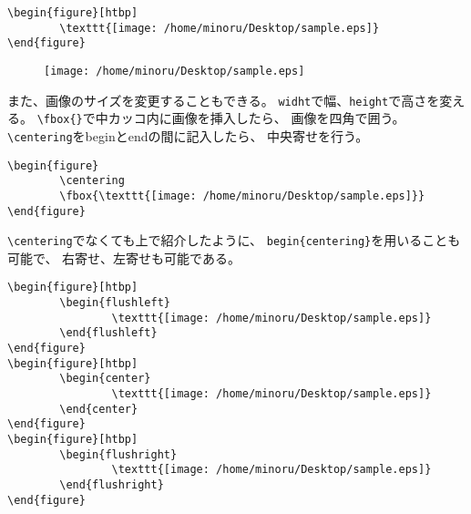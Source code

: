 \documentclass{jsarticle}
\begin{document}
\begin{verbatim}
\begin{figure}[htbp]
		\texttt{[image: /home/minoru/Desktop/sample.eps]}
\end{figure}
\end{verbatim}

\begin{figure}[htbp]
		\texttt{[image: /home/minoru/Desktop/sample.eps]}
\end{figure}

また、画像のサイズを変更することもできる。
\verb|widht|で幅、\verb|height|で高さを変える。
\verb|\fbox{}|で中カッコ内に画像を挿入したら、
画像を四角で囲う。
\verb|\centering|をbeginとendの間に記入したら、
中央寄せを行う。\par

\begin{verbatim}
\begin{figure}
		\centering
		\fbox{\texttt{[image: /home/minoru/Desktop/sample.eps]}}
\end{figure}
\end{verbatim}

\begin{figure}
		\centering
\end{figure}

\verb|\centering|でなくても上で紹介したように、
\verb|begin{centering}|を用いることも可能で、
右寄せ、左寄せも可能である。

\begin{verbatim}
\begin{figure}[htbp]
		\begin{flushleft}
				\texttt{[image: /home/minoru/Desktop/sample.eps]}
		\end{flushleft}
\end{figure}
\begin{figure}[htbp]
		\begin{center}
				\texttt{[image: /home/minoru/Desktop/sample.eps]}
		\end{center}
\end{figure}
\begin{figure}[htbp]
		\begin{flushright}
				\texttt{[image: /home/minoru/Desktop/sample.eps]}
		\end{flushright}
\end{figure}
\end{verbatim}
\end{document}
